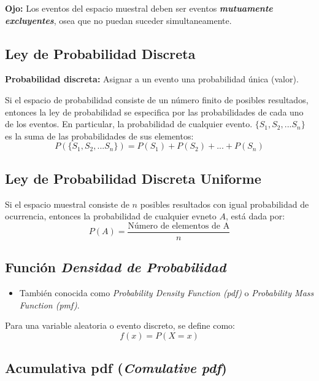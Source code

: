 \documentclass[]{book}
\providecommand{\tightlist}{%
  \setlength{\itemsep}{0pt}\setlength{\parskip}{0pt}}
\begin{document}
 \textbf{Ojo:} Los eventos del espacio muestral deben ser eventos
\textbf{\emph{mutuamente excluyentes}}, osea que no puedan suceder
simultaneamente.

\subsection{Ley de Probabilidad
Discreta}\label{ley-de-probabilidad-discreta-2}

\textbf{Probabilidad discreta:} Asignar a un evento una probabilidad
única (valor).

Si el espacio de probabilidad consiste de un número finito de posibles
resultados, entonces la ley de probabilidad se especifica por las
probabilidades de cada uno de los eventos. En particular, la
probabilidad de cualquier evento. \(\{S_1,S_2,...S_n\}\) es la suma de
las probabilidades de sus elementos:
\[P(\{S_1,S_2,...S_n\}) = P(S_1)+P(S_2)+...+P(S_n)\]

\subsection{Ley de Probabilidad Discreta
Uniforme}\label{ley-de-probabilidad-discreta-uniforme-2}

Si el espacio muestral consiste de \(n\) posibles resultados con igual
probabilidad de ocurrencia, entonces la probabilidad de cualquier evneto
\(A\), está dada por:
\[P(A)= \frac{\text{Número de elementos de A}}{n}\]

\subsection{\texorpdfstring{Función \emph{Densidad de
Probabilidad}}{Función Densidad de Probabilidad}}\label{funcion-densidad-de-probabilidad-2}

\begin{itemize}
\tightlist
\item
  También conocida como \emph{Probability Density Function (pdf)} o
  \emph{Probability Mass Function (pmf)}.
\end{itemize}

Para una variable aleatoria o evento discreto, se define como:
\[f(x) = P(X=x)\]

\subsection{\texorpdfstring{Acumulativa pdf (\emph{Comulative
pdf})}{Acumulativa pdf (Comulative pdf)}}\label{acumulativa-pdf-comulative-pdf-2}
\end{document}
